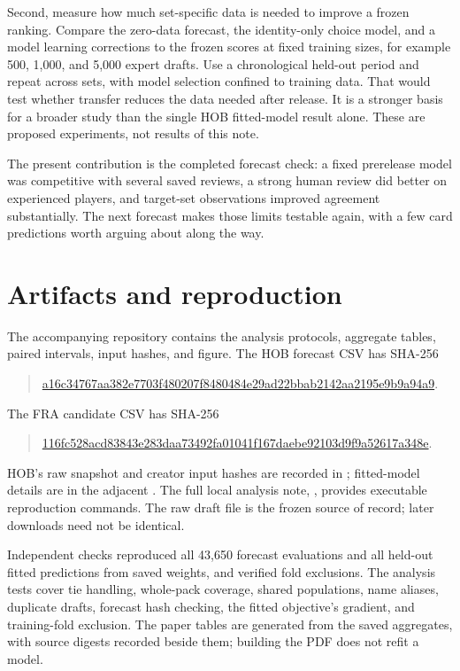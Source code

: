 \documentclass[11pt]{article}
\newcommand{\code}[1]{\texttt{\detokenize{#1}}}
\begin{document}
Second, measure how much set-specific data is needed to improve a frozen
ranking. Compare the zero-data forecast, the identity-only choice model,
and a model learning corrections to the frozen scores at fixed training
sizes, for example 500, 1,000, and 5,000 expert drafts. Use a chronological
held-out period and repeat across sets, with model selection confined to
training data. That would test whether transfer reduces the data needed
after release. It is a stronger basis for a broader study than the single
HOB fitted-model result alone. These are proposed experiments, not results
of this note.

The present contribution is the completed forecast check: a fixed
prerelease model was competitive with several saved reviews, a strong
human review did better on experienced players, and target-set observations
improved agreement substantially. The next forecast makes those limits
testable again, with a few card predictions worth arguing about along
the way.

\appendix
\section{Artifacts and reproduction}

The accompanying repository contains the analysis protocols, aggregate
tables, paired intervals, input hashes, and figure. The HOB forecast CSV
has SHA-256
\begin{quote}\footnotesize
\url{a16c34767aa382e7703f480207f8480484e29ad22bbab2142aa2195e9b9a94a9}.
\end{quote}
The FRA candidate CSV has SHA-256
\begin{quote}\footnotesize
\url{116fc528acd83843e283daa73492fa01041f167daebe92103d9f9a52617a348e}.
\end{quote}
HOB's raw snapshot and creator input hashes are recorded in
; fitted-model
details are in the adjacent \code{fitted_summary.json}. The full local
analysis note, , provides executable
reproduction commands. The raw draft file is the frozen source of record;
later downloads need not be identical.

Independent checks reproduced all 43,650 forecast evaluations and all
held-out fitted predictions from saved weights, and verified fold
exclusions. The analysis tests cover tie handling, whole-pack coverage,
shared populations, name aliases, duplicate drafts, forecast hash checking,
the fitted objective's gradient, and training-fold exclusion. The paper
tables are generated from the saved aggregates, with source digests recorded
beside them; building the PDF does not refit a model.
\end{document}
